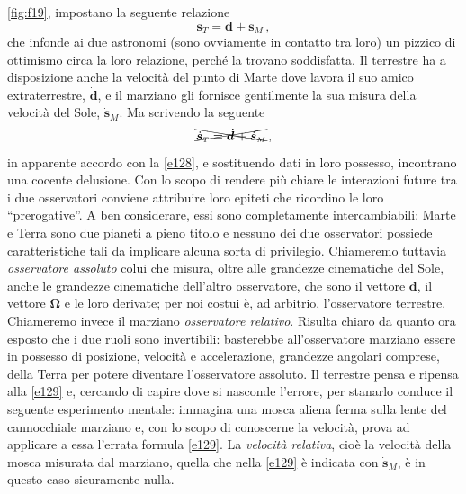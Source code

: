 \ref{fig:f19}, impostano la seguente relazione
\begin{equation}
	\bm{s}_{\scriptscriptstyle{T}}=
	\bm{d}+
	\bm{s}_{\scriptscriptstyle{M}}\,,
\label{e128}
\end{equation}
\noindent che infonde ai due astronomi (sono ovviamente in contatto tra loro)
un pizzico di ottimismo circa la loro relazione, perch\'e la trovano soddisfatta.
Il terrestre ha a disposizione anche la velocit\`a del punto di Marte dove lavora il suo
amico extraterrestre,
$\dot{\bm d}$, e il marziano gli fornisce gentilmente la sua misura della
velocit\`a del Sole,
$\dot{\bm{s}}_{\scriptscriptstyle{M}}$.
Ma scrivendo la seguente
\begin{equation}
\xcancel{\dot{\bm{s}}_{\scriptscriptstyle{T}}=
	\dot{\bm{d}}+
\dot{\bm{s}}_{\scriptscriptstyle{M}}}\,,
\label{e129}
\end{equation}
\noindent in apparente accordo con la \ref{e128}, e sostituendo dati in loro
possesso, incontrano una cocente delusione.
Con lo scopo di rendere pi\`u chiare le interazioni future tra i due osservatori
conviene attribuire loro epiteti che ricordino le loro ``prerogative''. A ben 
considerare, essi sono completamente intercambiabili: Marte e Terra sono
due pianeti a pieno titolo e nessuno dei due osservatori
possiede caratteristiche tali da
implicare alcuna sorta di privilegio. Chiameremo tuttavia
{\em osservatore assoluto} colui che
misura, oltre alle grandezze cinematiche del Sole,
anche le grandezze cinematiche dell'altro osservatore, che sono il
vettore $\bm d$, il vettore $\bm \Omega$ e le loro derivate; per noi costui \`e,
ad arbitrio, l'osservatore terrestre.
Chiameremo invece
il marziano {\em osservatore relativo}.
Risulta chiaro da quanto ora esposto che i due ruoli sono invertibili:
basterebbe all'osservatore marziano essere in possesso di posizione,
velocit\`a e accelerazione, grandezze angolari comprese, della
Terra per potere diventare 
l'osservatore assoluto.
\noindent Il terrestre pensa e ripensa alla \ref{e129} e, cercando di capire dove
si nasconde l'errore, per stanarlo conduce il seguente esperimento mentale: immagina una mosca
aliena ferma sulla lente del cannocchiale marziano e, con lo scopo
di conoscerne la velocit\`a, prova ad applicare a
essa l'errata 
formula \ref{e129}. La {\em velocit\`a relativa},
cio\`e la velocit\`a della mosca misurata dal marziano, quella che nella 
\ref{e129} \`e indicata con 
$\dot{\bm{s}}_{\scriptscriptstyle{M}}$,
 \`e in questo caso sicuramente nulla.
